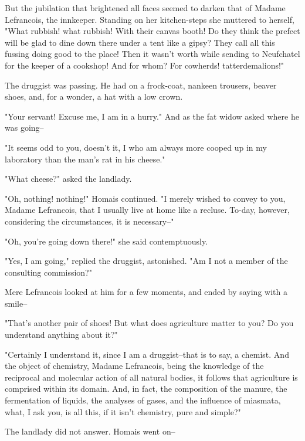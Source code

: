 \documentclass{tufte-book}
\begin{document}
But the jubilation that brightened all faces seemed to darken that of
Madame Lefrancois, the innkeeper. Standing on her kitchen-steps she
muttered to herself, "What rubbish! what rubbish! With their canvas
booth! Do they think the prefect will be glad to dine down there under
a tent like a gipsy? They call all this fussing doing good to the place!
Then it wasn't worth while sending to Neufchatel for the keeper of a
cookshop! And for whom? For cowherds! tatterdemalions!"

The druggist was passing. He had on a frock-coat, nankeen trousers,
beaver shoes, and, for a wonder, a hat with a low crown.

"Your servant! Excuse me, I am in a hurry." And as the fat widow asked
where he was going--

"It seems odd to you, doesn't it, I who am always more cooped up in my
laboratory than the man's rat in his cheese."

"What cheese?" asked the landlady.

"Oh, nothing! nothing!" Homais continued. "I merely wished to convey
to you, Madame Lefrancois, that I usually live at home like a recluse.
To-day, however, considering the circumstances, it is necessary--"

"Oh, you're going down there!" she said contemptuously.

"Yes, I am going," replied the druggist, astonished. "Am I not a member
of the consulting commission?"

Mere Lefrancois looked at him for a few moments, and ended by saying
with a smile--

"That's another pair of shoes! But what does agriculture matter to you?
Do you understand anything about it?"

"Certainly I understand it, since I am a druggist--that is to say,
a chemist. And the object of chemistry, Madame Lefrancois, being the
knowledge of the reciprocal and molecular action of all natural bodies,
it follows that agriculture is comprised within its domain. And, in
fact, the composition of the manure, the fermentation of liquids, the
analyses of gases, and the influence of miasmata, what, I ask you, is
all this, if it isn't chemistry, pure and simple?"

The landlady did not answer. Homais went on--
\end{document}
